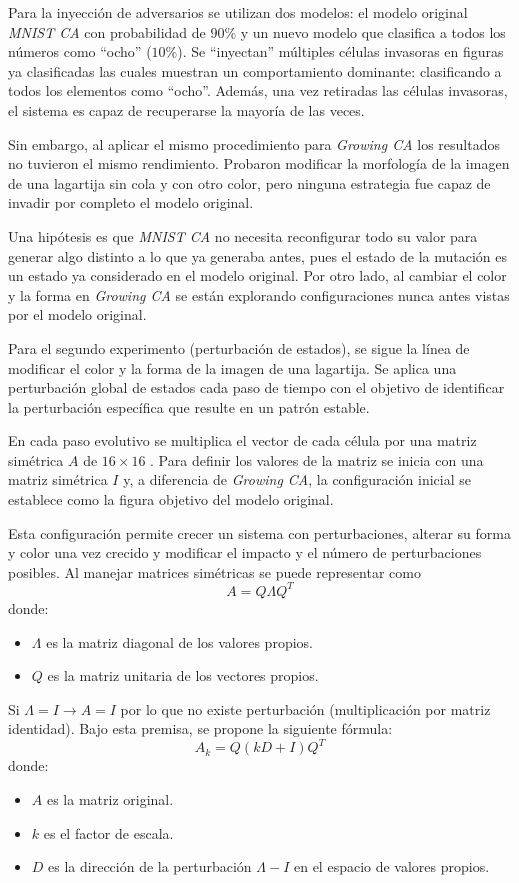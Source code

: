 Para la inyección de adversarios se utilizan dos modelos: el modelo original \textit{MNIST CA} con probabilidad de $90\%$ y un nuevo modelo que clasifica a todos los números como ``ocho'' ($10\%$).  Se ``inyectan'' múltiples células invasoras en figuras ya clasificadas las cuales muestran un comportamiento dominante: clasificando a todos los elementos como ``ocho''. Además, una vez retiradas las células invasoras, el sistema es capaz de recuperarse la mayoría de las veces.

Sin embargo, al aplicar el mismo procedimiento para \textit{Growing CA} los resultados no tuvieron el mismo rendimiento. Probaron modificar la morfología de la imagen de una lagartija sin cola y con otro color, pero ninguna estrategia fue capaz de invadir por completo el modelo original. 

Una hipótesis es que \textit{MNIST CA} no necesita reconfigurar todo su valor para generar algo distinto a lo que ya generaba antes, pues el estado de la mutación es un estado ya considerado en el modelo original. Por otro lado, al cambiar el color y la forma en \textit{Growing CA} se están explorando configuraciones nunca antes vistas por el modelo original.

Para el segundo experimento (perturbación de estados), se sigue la línea de modificar el color y la forma de la imagen de una lagartija. Se aplica una perturbación global de estados cada paso de tiempo con el objetivo de identificar la perturbación específica que resulte en un patrón estable.

En cada paso evolutivo se multiplica el vector de cada célula por una matriz simétrica $A$ de $16 \times 16$ \cite{mordvintsevNCA}. Para definir los valores de la matriz se inicia con una matriz simétrica $I$ y, a diferencia de \textit{Growing CA}, la configuración inicial se establece como la figura objetivo del modelo original.

Esta configuración permite crecer un sistema con perturbaciones, alterar su forma y color una vez crecido y modificar el impacto y el número de perturbaciones posibles. Al manejar matrices simétricas se puede representar como 
\[A = Q \Lambda Q^T\] 
donde: 
\begin{itemize}
	\item $\Lambda$ es la matriz diagonal de los valores propios.
	\item $Q$ es la matriz unitaria de los vectores propios.
\end{itemize} 
Si $\Lambda = I \to A = I$ por lo que no existe perturbación (multiplicación por  matriz identidad). Bajo esta premisa, se propone la siguiente fórmula:
\[ A_k = Q(kD + I)Q^T\]
donde:
\begin{itemize}
	\item $A$ es la matriz original.
	\item $k$ es el factor de escala.
	\item $D$ es la dirección de la perturbación $\Lambda - I$ en el espacio de valores propios. 
\end{itemize}

